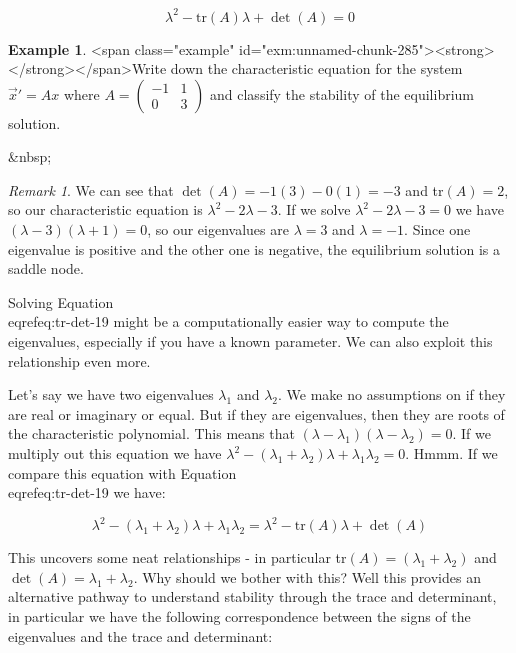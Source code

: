 \documentclass[
]{book}
\theoremstyle{definition}
\theoremstyle{definition}
\newtheorem{example}{Example}[chapter]
\theoremstyle{definition}
\theoremstyle{remark}
\newtheorem*{remark}{Remark}
\begin{document}
\begin{equation}
\lambda^{2} - \mbox{tr}(A)\lambda + \det(A)=0 \label{eq:tr-det-19}
\end{equation}
\begin{example}
<span class="example" id="exm:unnamed-chunk-285"><strong>\label{exm:unnamed-chunk-285} </strong></span>Write down the characteristic equation for the system $\vec{x}'=Ax$ where $\displaystyle A=  \begin{pmatrix} -1 & 1 \\ 0 &  3 \end{pmatrix}$ and classify the stability of the equilibrium solution.
\end{example}
&nbsp;
\begin{remark}
{}We can see that $\det(A)= -1(3) - 0(1) = -3$ and tr$(A)=2$, so our characteristic equation is $\lambda^{2}-2\lambda -3$.  If we solve $\lambda^{2}-2\lambda -3=0$ we have $(\lambda-3)(\lambda+1)=0$, so our eigenvalues are $\lambda=3$ and $\lambda=-1$. Since one eigenvalue is positive and the other one is negative, the equilibrium solution is a saddle node.
\end{remark}

Solving Equation \\eqref{eq:tr-det-19} might be a computationally easier way to compute the eigenvalues, especially if you have a known parameter. We can also exploit this relationship even more.

Let's say we have two eigenvalues $\lambda_{1}$ and $\lambda_{2}$.  We make no assumptions on if they are real or imaginary or equal.  But if they are eigenvalues, then they are roots of the characteristic polynomial.  This means that $(\lambda-\lambda_{1})(\lambda-\lambda_{2})=0$.  If we multiply out this equation we have $\lambda^{2}-(\lambda_{1}+\lambda_{2}) \lambda + \lambda_{1} \lambda_{2}=0$.  Hmmm.  If we compare this equation with Equation \\eqref{eq:tr-det-19} we have:

\begin{equation}
\lambda^{2}-(\lambda_{1}+\lambda_{2}) \lambda + \lambda_{1} \lambda_{2} = \lambda^{2} - \mbox{tr}(A)\lambda + \det(A)
\end{equation}

This uncovers some neat relationships - in particular tr$(A)=(\lambda_{1}+\lambda_{2})$ and $\det(A)=\lambda_{1}+\lambda_{2}$.  Why should we bother with this?  Well this provides an alternative pathway to understand stability through the trace and determinant, in particular we have the following correspondence between the signs of the eigenvalues and the trace and determinant:
\end{document}
